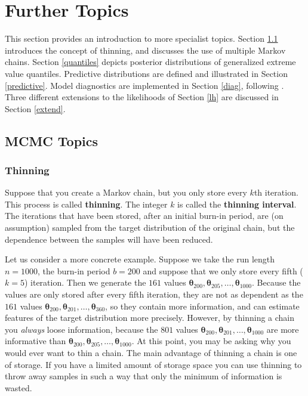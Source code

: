 \documentclass[11pt,a4paper]{article}
\newcommand{\bs}{\boldsymbol}
\begin{document}
\section{Further Topics}
\setcounter{footnote}{0}
\label{further}

This section provides an introduction to more specialist topics.
Section \ref{mcmc} introduces the concept of thinning, and discusses the use of multiple Markov chains.
Section \ref{quantiles} depicts posterior distributions of generalized extreme value quantiles.
Predictive distributions are defined and illustrated in Section \ref{predictive}.
Model diagnostics are implemented in Section \ref{diag}, following \citet{gelmcarl95}.  
Three different extensions to the likelihoods of Section \ref{lh} are discussed in Section \ref{extend}.

\subsection{MCMC Topics}
\label{mcmc}

\subsubsection{Thinning}
\label{thin}

Suppose that you create a Markov chain, but you only store every $k$th iteration.
This process is called \textbf{thinning}.
The integer $k$ is called the \textbf{thinning interval}.
The iterations that have been stored, after an initial burn-in period, are (on assumption) sampled from the target distribution of the original chain, but the dependence between the samples will have been reduced.

Let us consider a more concrete example.
Suppose we take the run length $n=1000$, the burn-in period $b=200$ and suppose that we only store every fifth ($k=5$) iteration.
Then we generate the $161$ values $\bs{\theta}_{200},\bs{\theta}_{205},\dots,\bs{\theta}_{1000}$.
Because the values are only stored after every fifth iteration, they are not as dependent as the $161$ values $\bs{\theta}_{200},\bs{\theta}_{201},\dots,\bs{\theta}_{360}$, so they contain more information, and can estimate features of the target distribution more precisely.
However, by thinning a chain you \emph{always} loose information, because the $801$ values $\bs{\theta}_{200},\bs{\theta}_{201},\dots,\bs{\theta}_{1000}$ are more informative than $\bs{\theta}_{200},\bs{\theta}_{205},\dots,\bs{\theta}_{1000}$.
At this point, you may be asking why you would ever want to thin a chain.
The main advantage of thinning a chain is one of storage.
If you have a limited amount of storage space you can use thinning to throw away samples in such a way that only the minimum of information is wasted.
\end{document}
